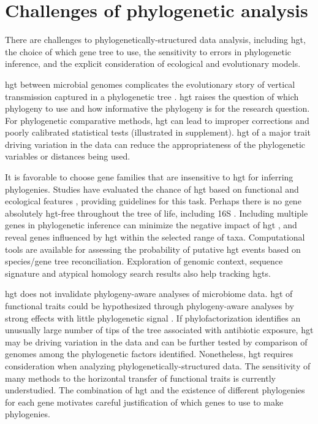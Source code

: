 \section{Challenges of phylogenetic analysis}
There are challenges to phylogenetically-structured data analysis, including \gls{hgt}, the choice of which gene tree to use, the sensitivity to errors in phylogenetic inference, and the explicit consideration of ecological and evolutionary models.\par
\gls{hgt} between microbial genomes complicates the evolutionary story of vertical transmission captured in a phylogenetic tree \cite{gogarten_hgt}. \gls{hgt} raises the question of which phylogeny to use and how informative the phylogeny is for the research question. For phylogenetic comparative methods, \gls{hgt} can lead to improper corrections and poorly calibrated statistical tests (illustrated in supplement). \gls{hgt} of a major trait driving variation in the data can reduce the appropriateness of the phylogenetic variables or distances being used.\par
It is favorable to choose gene families that are insensitive to \gls{hgt} for inferring phylogenies. Studies have evaluated the chance of \gls{hgt} based on functional and ecological features\cite{gogarten_hgt} \cite{complexity_hypothesis}, providing guidelines for this task. Perhaps there is no gene absolutely \gls{hgt}-free throughout the tree of life, including 16S \cite{kitahara_hgt}. Including multiple genes in phylogenetic inference can minimize the negative impact of \gls{hgt} \cite{phylophlan}, and reveal genes influenced by \gls{hgt} within the selected range of taxa\cite{purdom}. Computational tools are available for assessing the probability of putative \gls{hgt} events based on species/gene tree reconciliation\cite{Washburne2017-up}. Exploration of genomic context, sequence signature and atypical homology search results also help tracking \gls{hgt}s\cite{ravenhall_hgt}. \par
\gls{hgt} does not invalidate phylogeny-aware analyses of microbiome data. \gls{hgt} of functional traits could be hypothesized through phylogeny-aware analyses by strong effects with little phylogenetic signal \cite{lozupone_species_divergence}. If phylofactorization identifies an unusually large number of tips of the tree associated with antibiotic exposure, \gls{hgt} may be driving variation in the data and can be further tested by comparison of genomes among the phylogenetic factors identified. Nonetheless, \gls{hgt} requires consideration when analyzing phylogenetically-structured data. The sensitivity of many methods to the horizontal transfer of functional traits is currently understudied. The combination of \gls{hgt} and the existence of different phylogenies for each gene motivates careful justification of which genes to use to make phylogenies.
